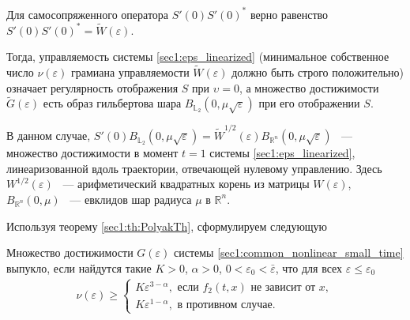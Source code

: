 \documentclass[../main.tex]{subfiles}
\begin{document}
Для самосопряженного оператора $S'(0)S'(0)^*$ верно равенство $S'(0)S'(0)^* = \widetilde{W}(\varepsilon)$.
  
Тогда, управляемость системы \eqref{sec1:eps_linearized} (минимальное собственное число $ \nu(\varepsilon) $ грамиана управляемости $\widetilde{W}(\varepsilon)$ должно быть строго положительно) означает регулярность отображения $S$ при $\upsilon = 0$, а множество достижимости $\widetilde{G}(\varepsilon)$ есть образ гильбертова шара $B_{\mathbb{L}_2}(0,\mu\sqrt{\varepsilon})$ при его отображении $S$.
   
В данном случае, $S'(0)B_{\mathbb{L}_2}(0,\mu\sqrt{\varepsilon}) = \widetilde{W}^{1/2}(\varepsilon)B_{\mathbb{R}^n}(0,\mu\sqrt{\varepsilon}) $ ~--- множество достижимости в момент $t = 1$ системы \eqref{sec1:eps_linearized}, линеаризованной вдоль траектории, отвечающей нулевому управлению.
Здесь $W^{1/2}(\varepsilon)$ ~--- арифметический квадратных корень из матрицы $W(\varepsilon)$, $ B_{\mathbb{R}^n}(0,\mu) $ ~--- евклидов шар радиуса $ \mu $ в $ \mathbb{R}^n $.
 
Используя теорему \ref{sec1:th:PolyakTh}, сформулируем следующую
\begin{theorem}\label{sec1:th:sec1:th:small_time_convexity}
     Множество достижимости $G(\varepsilon)$ системы \eqref{sec1:common_nonlinear_small_time} выпукло, если найдутся такие $K > 0$, $ \alpha > 0$, $ 0 < \varepsilon_0 < \bar{\varepsilon}$, что для всех $\varepsilon \leqslant \varepsilon_0$
     \begin{gather}\label{sec1:small_time_convexity_condition}
         \nu(\varepsilon) \geqslant \left\{ {\begin{array}{*{20}{l}}
         {K\varepsilon ^{3 - \alpha}, \mbox{\ если \ } f_2(t,x) \mbox{\ не зависит от \ } x}, \\
         {K\varepsilon ^{1 - \alpha}}, \mbox{\ в противном случае}.
         \end{array}} \right.
     \end{gather}
 \end{theorem}
\end{document}
